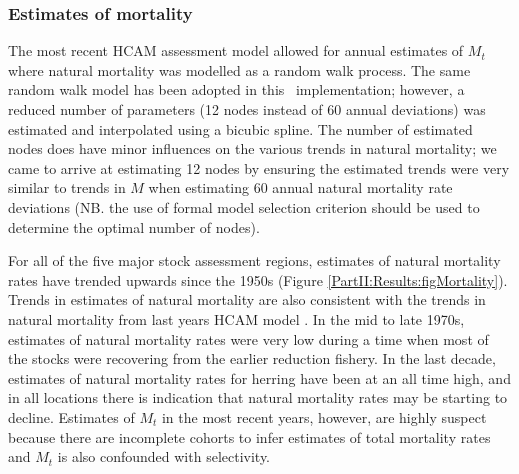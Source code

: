 \subsubsection{Estimates of mortality}

The most recent HCAM assessment model allowed for annual estimates of $M_t$ where natural mortality was modelled as a random walk process.  The same random walk model has been adopted in this \iscam\ implementation; however, a reduced number of parameters (12 nodes instead of 60 annual deviations) was estimated and interpolated using a bicubic spline.  The number of estimated nodes does have minor influences on the various trends in natural mortality; we came to arrive at estimating 12 nodes by ensuring the estimated trends were very similar to trends in $M$ when estimating 60 annual natural mortality rate deviations (NB. the use of formal model selection criterion should be used to determine the optimal number of nodes).

For all of the five major stock assessment regions, estimates of natural mortality rates have trended upwards since the 1950s (Figure \ref{PartII:Results:figMortality}).  Trends in estimates of natural mortality are also consistent with the trends in natural mortality from last years HCAM model  \citep[see Figure 18 in][]{Clear2010}.  In the mid to late 1970s, estimates of natural mortality rates were very low during a time when most of the stocks were recovering from the earlier reduction fishery.  In the last decade, estimates of natural mortality rates for herring have been at an all time high, and in all locations there is indication that natural mortality rates may be starting to decline. Estimates of $M_t$ in the most recent years, however,  are highly suspect because there are incomplete cohorts to infer estimates of total mortality rates and $M_t$ is also confounded with selectivity.



